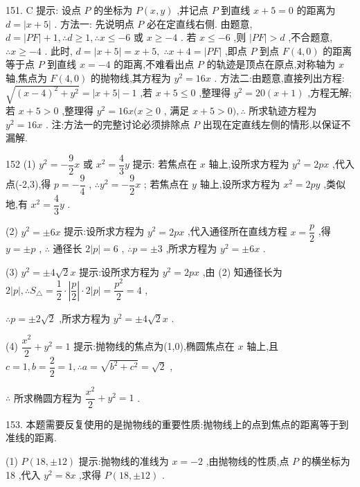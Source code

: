 151. C 提示: 设点 $P$ 的坐标为 $P\left( {x,y}\right)$ ,并记点 $P$ 到直线 $x + 5 = 0$ 的距离为 $d = \left| {x + 5}\right|$ . 方法一: 先说明点 $P$ 必在定直线右侧. 由题意, $d = \left| {PF}\right|  + 1,\therefore d \geq  1,\therefore x \leq   - 6$ 或 $x \geq   - 4$ . 若 $x \leq   - 6$ ,则 $\left| {PF}\right|  > d$ ,不合题意, $\therefore x \geq   - 4$ . 此时, $d = \left| {x + 5}\right|  = x + 5,\;\therefore x + 4 = \left| {PF}\right|$ ,即点 $P$ 到点 $F\left( {4,0}\right)$ 的距离等于点 $P$ 到直线 $x =  - 4$ 的距离,不难看出点 $P$ 的轨迹是顶点在原点,对称轴为 $x$ 轴,焦点为 $F\left( {4,0}\right)$ 的抛物线,其方程为 ${y}^{2} = {16x}$ . 方法二:由题意,直接列出方程: $\sqrt{{\left( x - 4\right) }^{2} + {y}^{2}} = \left| {x + 5}\right|  - 1$ ,若 $x + 5 \leq  0$ ,整理得 ${y}^{2} = {20}\left( {x + 1}\right)$ ,方程无解; 若 $x + 5 > 0$ ,整理得 ${y}^{2} = {16x}(x \geq  0$ , 满足 $x + 5 > 0),\therefore$ 所求轨迹方程为 ${y}^{2} = {16x}$ . 注:方法一的完整讨论必须排除点 $P$ 出现在定直线左侧的情形,以保证不漏解.

152 (1) ${y}^{2} =  - \dfrac{9}{2}x$ 或 ${x}^{2} = \dfrac{4}{3}y$ 提示: 若焦点在 $x$ 轴上,设所求方程为 ${y}^{2} = {2px}$ ,代入点(-2,3),得 $p =  - \dfrac{9}{4}$ , $\therefore {y}^{2} =  - \dfrac{9}{2}x$ ; 若焦点在 $y$ 轴上,设所求方程为 ${x}^{2} = {2py}$ ,类似地,有 ${x}^{2} = \dfrac{4}{3}y$ .

(2) ${y}^{2} =  \pm  {6x}$ 提示:设所求方程为 ${y}^{2} = {2px}$ ,代入通径所在直线方程 $x = \dfrac{p}{2}$ ,得 $y =  \pm  p$ , $\therefore$ 通径长 $2\left| p\right|  = 6$ , $\therefore p =  \pm  3$ ,所求方程为 ${y}^{2} =  \pm  {6x}$ .

(3) ${y}^{2} =  \pm  4\sqrt{2}x$ 提示:设所求方程为 ${y}^{2} = {2px}$ ,由 (2) 知通径长为 $2\left| p\right| ,\therefore {S}_{ \bigtriangleup  } = \dfrac{1}{2} \cdot  \left| \dfrac{p}{2}\right|  \cdot  2\left| p\right|  = \dfrac{{p}^{2}}{2} = 4$ ,

$\therefore p =  \pm  2\sqrt{2}$ ,所求方程为 ${y}^{2} =  \pm  4\sqrt{2}x$ .

(4) $\dfrac{{x}^{2}}{2} + {y}^{2} = 1$ 提示:抛物线的焦点为(1,0),椭圆焦点在 $x$ 轴上,且 $c = 1,b = \dfrac{2}{2} = 1,\therefore a = \sqrt{{b}^{2} + {c}^{2}} = \sqrt{2}$ ,

$\therefore$ 所求椭圆方程为 $\dfrac{{x}^{2}}{2} + {y}^{2} = 1$ .

153. 本题需要反复使用的是抛物线的重要性质:抛物线上的点到焦点的距离等于到准线的距离.

(1) $P\left( {{18}, \pm  {12}}\right)$ 提示:抛物线的准线为 $x =  - 2$ ,由抛物线的性质,点 $P$ 的横坐标为 18 ,代入 ${y}^{2} = {8x}$ ,求得 $P\left( {{18}, \pm  {12}}\right)$ .

